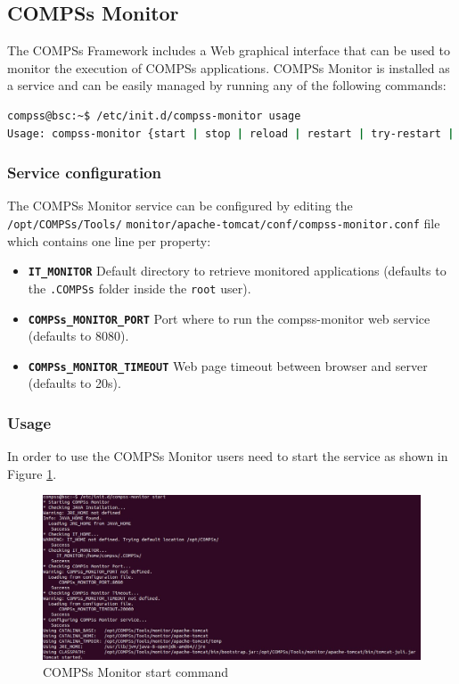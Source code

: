 \subsection{COMPSs Monitor}
\label{subsec:monitor}
The COMPSs Framework includes a Web graphical interface that can be used to monitor the execution of COMPSs applications. COMPSs Monitor is installed as a service and can be easily managed by running any of the following
commands:
\begin{lstlisting}[language=bash]
compss@bsc:~$ /etc/init.d/compss-monitor usage
Usage: compss-monitor {start | stop | reload | restart | try-restart | force-reload | status}
\end{lstlisting}

\subsubsection{Service configuration}
The COMPSs Monitor service can be configured by editing the \texttt{/opt/COMPSs/Tools/}
\texttt{monitor/apache-tomcat/conf/compss-monitor.conf}
file which contains one line per property:
\begin{itemize}
 \item \texttt{\textbf{IT\_MONITOR}} Default directory to retrieve monitored applications (defaults to the \texttt{.COMPSs} folder inside the \texttt{root} user).
 \item \texttt{\textbf{COMPSs\_MONITOR\_PORT}} Port where to run the compss-monitor web service (defaults to 8080).
 \item \texttt{\textbf{COMPSs\_MONITOR\_TIMEOUT}} Web page timeout between browser and server (defaults to 20s).
\end{itemize}

\subsubsection{Usage}
In order to use the COMPSs Monitor users need to start the service as shown in Figure \ref{fig:monitor_start}.
\begin{figure}[thb!]
  \centering
    \includegraphics[width=\textwidth]{./Sections/4_Tools/Figures/monitor_start.jpeg}
    \caption{COMPSs Monitor start command}
    \label{fig:monitor_start}
\end{figure}

